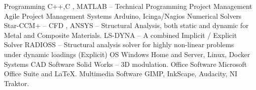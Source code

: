 \begin{cvhonors}
  \cvhonor
    {Programming}
    {C++,C , MATLAB – Technical Programming
}
    {}
    {}
   \cvhonor
    {Project Management}
    {Agile Project Management}
    {}
    {}
  \cvhonor
  \cvhonor
    {Systems}
    {Arduino, Icinga/Nagios}
    {}
    {}
  \cvhonor
    {Numerical Solvers}
    {Star-CCM+ – CFD , ANSYS – Structural Analysis, both static and dynamic for Metal and Composite Materials. LS-DYNA – A combined Implicit / Explicit Solver RADIOSS – Structural analysis solver for highly non-linear problems under dynamic loadings (Explicit)
}
    {}
    {}
  \cvhonor
    {OS}
    {Windows Home and Server, Linux, Docker Systems}
    {}
    {}
      \cvhonor
    {CAD Software}
    {Solid Works – 3D modulation.}
    {}
    {}
      \cvhonor
    {Office Software}
    {Microsoft Office Suite and LaTeX.}
    {}
    {}
          \cvhonor
        {Multimedia Software}
    {GIMP, InkScape, Audacity, NI Traktor.}
    {}
    {}
\end{cvhonors}